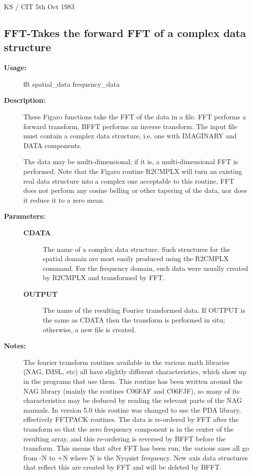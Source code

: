 \begin{description}
\begin{description}
\begin{terminalv}
                                         KS / CIT 5th Oct 1983
\end{terminalv}
\end{description}
\subsection{FFT-\label{FFT}Takes the forward FFT of a complex data structure}
\begin{description}

\item [\textbf{Usage:}]
 fft spatial\_data frequency\_data

\item [\textbf{Description:}]
 These Figaro functions take the FFT of the data in a file.
 FFT performs a forward transform, BFFT performs an inverse
 transform.  The input file must contain a complex data
 structure, i.e. one with IMAGINARY and DATA components.

 The data may be multi-dimensional; if it is, a multi-dimensional
 FFT is performed.  Note that the Figaro routine R2CMPLX will turn
 an existing real data structure into a complex one acceptable to
 this routine. FFT does not perform any cosine belling or other
 tapering of the data, nor does it reduce it to a zero mean.

\item [\textbf{Parameters:}]
\begin{description}
\item [\textbf{CDATA}]
 The name of a complex data structure. Such structures
 for the spatial domain are most easily produced using the
 R2CMPLX command. For the frequency domain, such data were
 usually created by R2CMPLX and transformed by FFT.
\item [\textbf{OUTPUT}]
 The name of the resulting Fourier transformed data.
 If OUTPUT is the same as CDATA then the transform is
 performed in situ; otherwise, a new file is created.
\end{description}

\item [\textbf{Notes:}]
 The fourier transform routines available in the various math
 libraries (NAG, IMSL, etc) all have slightly different
 characteristics, which show up in the programs that use them.
 This routine has been written around the NAG library (mainly
 the routines C06FAF and C06FJF), so many of its characteristics
 may be deduced by reading the relevant parts of the NAG manuals.
 In version 5.0 this routine was changed to use the PDA library,
 effectively FFTPACK routines. The data is re-ordered by FFT after
 the transform so that the zero frequency component is in the
 center of the resulting array, and this re-ordering is reversed by
 BFFT before the transform. This means that after FFT has been run,
 the various axes all go from -N to +N where N is the Nyquist
 frequency.  New axis data structures that reflect this are created
 by FFT and will be deleted by BFFT.


\end{description}
\end{description}
